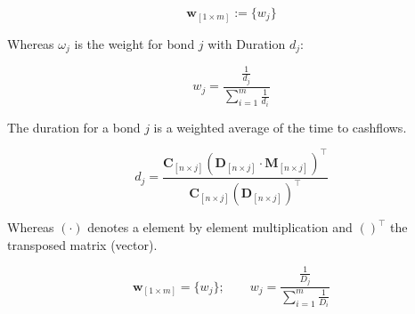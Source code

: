 \begin{equation}\label{weights}
    \bm{w}_{\left[1\times m\right]}:= \{w_j\}
\end{equation}

Whereas $\omega_j$ is the weight for bond $j$ with Duration $d_j$:

\begin{displaymath}
    w_j=\frac{\frac{1}{d_j}}{\sum_{i=1}^m\frac{1}{d_i}}
\end{displaymath}


The duration for a bond $j$ is a weighted average of the time to cashflows.

\begin{equation}\label{duration}
d_j= \frac{\bm{C}_{\left[n \times j\right]} \left(\bm{D}_{\left[n\times j\right]} \cdot \bm{M}_{\left[n\times j\right]}\right)^{\top}} {\bm{C}_{\left[n \times j\right]}\left(\bm{D}_{\left[n\times j\right]}\right)^{\top}}
\end{equation}

Whereas $(\cdot)$ denotes a element by element multiplication and $( )^{\top}$ the transposed matrix (vector).



\begin{equation}\label{eq:weights}
  \bm{w}_{\left[1\times m\right]}= \{w_j\}; \qquad   w_j=\frac{\frac{1}{D_j}}{\sum_{i=1}^m\frac{1}{D_i}}
\end{equation}


